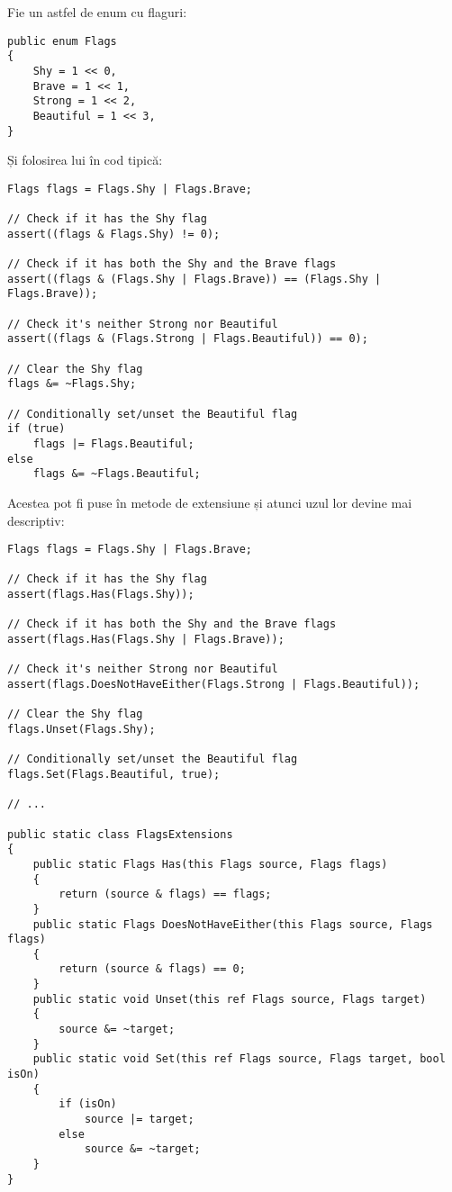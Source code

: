 \documentclass[a4paper,12pt]{report}
\begin{document}
Fie un astfel de enum cu flaguri:

\begin{verbatim}
public enum Flags
{
    Shy = 1 << 0,
    Brave = 1 << 1,
    Strong = 1 << 2,
    Beautiful = 1 << 3,
}
\end{verbatim}

Și folosirea lui în cod tipică:

\begin{verbatim}
Flags flags = Flags.Shy | Flags.Brave;

// Check if it has the Shy flag
assert((flags & Flags.Shy) != 0);

// Check if it has both the Shy and the Brave flags
assert((flags & (Flags.Shy | Flags.Brave)) == (Flags.Shy | Flags.Brave));

// Check it's neither Strong nor Beautiful
assert((flags & (Flags.Strong | Flags.Beautiful)) == 0);

// Clear the Shy flag
flags &= ~Flags.Shy;

// Conditionally set/unset the Beautiful flag
if (true)
    flags |= Flags.Beautiful;
else
    flags &= ~Flags.Beautiful;
\end{verbatim}

Acestea pot fi puse în metode de extensiune și atunci uzul lor devine mai descriptiv:

\begin{verbatim}
Flags flags = Flags.Shy | Flags.Brave;

// Check if it has the Shy flag
assert(flags.Has(Flags.Shy));

// Check if it has both the Shy and the Brave flags
assert(flags.Has(Flags.Shy | Flags.Brave));

// Check it's neither Strong nor Beautiful
assert(flags.DoesNotHaveEither(Flags.Strong | Flags.Beautiful));

// Clear the Shy flag
flags.Unset(Flags.Shy);

// Conditionally set/unset the Beautiful flag
flags.Set(Flags.Beautiful, true);

// ...

public static class FlagsExtensions
{
    public static Flags Has(this Flags source, Flags flags)
    {
        return (source & flags) == flags;
    }
    public static Flags DoesNotHaveEither(this Flags source, Flags flags)
    {
        return (source & flags) == 0;
    }
    public static void Unset(this ref Flags source, Flags target)
    {
        source &= ~target;
    }
    public static void Set(this ref Flags source, Flags target, bool isOn)
    {
        if (isOn)
            source |= target;
        else
            source &= ~target;
    }
}
\end{verbatim}
\end{document}
